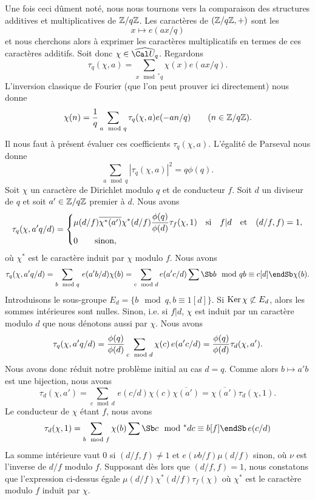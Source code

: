 \bigskip
Une fois ceci d\^ument not\'e, nous nous tournons vers la comparaison
des structures additives et multiplicatives de $\Bbb Z/q\Bbb Z$. Les
caract\`eres de $(\Bbb Z/q\Bbb Z,+)$ sont les
$$
x\mapsto e(ax/q)
$$
et nous cherchons alors \`a exprimer les caract\`eres multiplicatifs
en termes de ces caract\`eres additifs. Soit donc
$\chi\in\widehat{\Cal U_q}$. Regardons
$$
\tau_q(\chi,a)=\sum_{x\mod^*q}\chi(x)e(ax/q).
$$
L'inversion classique de Fourier (que l'on peut prouver ici
directement) nous donne
$$
\chi(n)=\frac{1}{q}\sum_{a\mod q}\tau_q(\chi,a) e(-an/q)
\qquad(n\in\Bbb Z/q\Bbb Z).
$$
Il nous faut \`a pr\'esent \'evaluer ces coefficients
$\tau_q(\chi,a)$. L'\'egalit\'e de Parseval nous donne
$$
\sum_{a\mod q}|\tau_q(\chi,a)|^2=q\phi(q).
$$
 Soit $\chi$ un caract\`ere de Dirichlet
modulo $q$ et de conducteur $f$. Soit $d$ un diviseur de $q$
et soit $a'\in\Bbb Z/q\Bbb Z$ premier \`a $d$. Nous avons
$$
\tau_{q}(\chi,a'q/d)=\left\{
\aligned
&\mu(d/f)\overline{ \chi^*(a')}\chi^*(d/f)\frac{\phi(q)}{\phi(d)}
\tau_{f}(\chi,1)\quad
\text{si}\quad f|d\quad\text{et}\quad(d/f,f)=1,\\
&0 \qquad\text{sinon},
\endaligned
\right.
$$
o\`u $\chi^*$ est le caract\`ere induit par $\chi$ modulo $f$.
\endproclaim
{}
Nous avons
$$
\tau_q(\chi,a'q/d)=\sum_{b\mod q}\,e(a'b/d)\chi(b)
=\sum_{c\mod d}e(a'c/d)\sum\Sb b\mod q\\ b\equiv c[d]\endSb\chi(b).
$$
Introduisons le sous-groupe $E_d=\{b\mod q, b\equiv 1[d]\}$. Si
$\Ker\chi\not\subset E_d$, alors les sommes int\'erieures sont nulles. Sinon,
i.e. si $f|d$,
$\chi$ est induit par un caract\`ere modulo $d$ que nous d\'enotons
aussi par $\chi$. Nous avons
$$
\tau_q(\chi,a'q/d)={\phi(q)\over\phi(d)}\sum_{c\mod d}\chi(c)\,e(a'c/d)
={\phi(q)\over\phi(d)}\tau_{d}(\chi,a').
$$
Nous avons donc r\'eduit notre probl\`eme initial au cas
$d=q$. Comme alors $b\mapsto a'b$ est une bijection, nous avons
$$
\tau_{d}(\chi,a')=\sum_{c\mod d}\,e(c/d)\chi(c)\overline{\chi(a')}
=\overline{\chi(a')}\tau_{d}(\chi,1).
$$
Le conducteur de $\chi$ \'etant $f$, nous avons
$$
\tau_{d}(\chi,1)=\sum_{b\mod f}\chi(b)\sum\Sb c\mod^* d\\ c\equiv
b[f]\endSb \,e(c/d)
$$
La somme int\'erieure vaut 0 si $(d/f,f)\neq1$ et $e(\nu b/f)\mu(d/f)$
sinon, o\`u $\nu$ est l'inverse de $d/f$ modulo $f$. Supposant d\`es
lors que $(d/f,f)=1$, nous constatons que l'expression ci-dessus \'egale
$\mu(d/f)\chi^*(d/f) \tau_{f}(\chi)$ o\`u $\chi^*$ est le caract\`ere modulo
$f$ induit par $\chi$.
\fin

